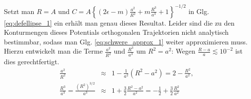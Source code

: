 \documentclass{book}
\begin{document}
%
Setzt man $R = A$ und $C = A\left\{\left(2\epsilon - m\right)\frac{a^2}{R^2} + m\frac{R^3}{a^3} + 1\right\}^{-1/2}$ in Glg. \eqref{eq:defellipse_1} ein erhält man genau dieses Resultat. Leider sind die zu den Konturmengen dieses Potentials orthogonalen Trajektorien nicht analytisch bestimmbar, sodass man Glg. \eqref{eq:schwere_approx_1} weiter approximieren muss. Hierzu entwickelt man die Terme $\frac{a^2}{R^2}$ und $\frac{R^3}{a^3}$ um $R^2 = a^2$: Wegen $\frac{R - a}{a}\lesssim 10^{-2}$ ist dies gerechtfertigt.
%
\begin{eqnarray}
\frac{a^2}{R^2}&\approx&1 - \frac{1}{a^2}\left(R^2 - a^2\right) = 2 - \frac{R^2}{a^2},\\
\frac{R^3}{a^3} = \frac{\left(R^2\right)^{3/2}}{a^3}&\approx&1 + \frac{3}{2}\frac{R^2 - a^2}{a^2} = -\frac{1}{2} + \frac{3}{2}\frac{R^2}{a^2}
\end{eqnarray}
\end{document}
